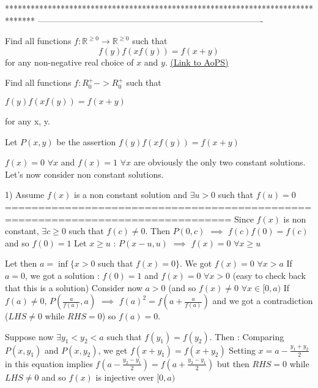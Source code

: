 *******************************************************************************
-------------------------------------------------------------------------------

\begin{problem}
	Find all functions $f: \mathbb R^{\geq 0} \to \mathbb R^{\geq 0}$ such that
\[f(y)f(xf(y))=f(x+y)\]
for any non-negative real choice of $x$ and $y$.
	\flushright \href{https://artofproblemsolving.com/community/c6h307856}{(Link to AoPS)}
\end{problem}



\begin{solution}
	\begin{tcolorbox}Find all functions $ f: R^ + _0 - > R^ + _0$ such that

$ f(y)f(xf(y)) = f(x + y)$

for any x, y.\end{tcolorbox}

Let $ P(x,y)$ be the assertion $ f(y)f(xf(y))=f(x+y)$

$ f(x)=0$ $ \forall x$ and $ f(x)=1$ $ \forall x$ are obviously the only two constant solutions. Let's now consider non constant solutions.

1) Assume $ f(x)$ is a non constant solution and $ \exists u>0$ such that $ f(u)=0$
================================================================================
Since $ f(x)$ is non constant, $ \exists c\geq 0$ such that $ f(c)\ne 0$. Then $ P(0,c)$ $ \implies$ $ f(c)f(0)=f(c)$ and so $ f(0)=1$
Let $ x\ge u$ : $ P(x-u,u)$ $ \implies$ $ f(x)=0$ $ \forall x\ge u$

Let then $ a=\inf\{x>0$ such that $ f(x)=0\}$. We got $ f(x)=0$ $ \forall x>a$
If $ a=0$, we got a solution : $ f(0)=1$ and $ f(x)=0$ $ \forall x>0$ (easy to check back that this is a solution)
Consider now $ a>0$ (and so $ f(x)\ne 0$ $ \forall x\in[0,a)$
If $ f(a)\ne 0$, $ P(\frac a{f(a)},a)$ $ \implies$ $ f(a)^2=f(a+\frac a{f(a)})$ and we got a contradiction ($ LHS\ne 0$ while $ RHS=0$) so $ f(a)=0$.

Suppose now $ \exists y_1<y_2<a$ such that $ f(y_1)=f(y_2)$. Then :
Comparing $ P(x,y_1)$ and $ P(x,y_2)$, we get $ f(x+y_1)=f(x+y_2)$
Setting $ x=a-\frac{y_1+y_2}2$ in this equation implies $ f(a-\frac{y_2-y_1 }2)=f(a+\frac{y_2-y_1}2)$ but then $ RHS=0$ while $ LHS\ne 0$ and so $ f(x)$ is injective over $ [0,a)$


\end{solution}
